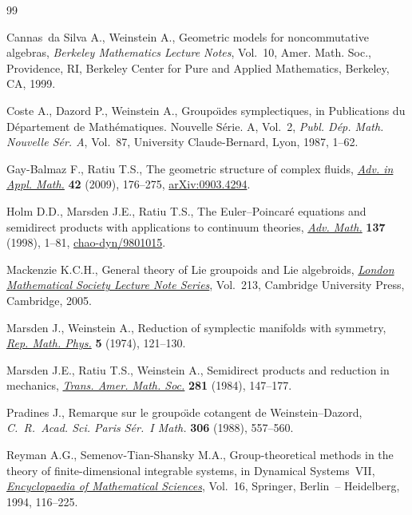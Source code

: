\documentclass[pdftex]{sigma}
\numberwithin{equation}{section}
\begin{document}
\begin{thebibliography}{99}
\footnotesize\itemsep=0pt

Cannas~da Silva A., Weinstein A., Geometric models for noncommutative algebras,
 \textit{Berkeley Mathematics Lecture Notes}, Vol.~10, Amer. Math. Soc.,
 Providence, RI, Berkeley Center for Pure and Applied Mathematics, Berkeley,
 CA, 1999.

Coste A., Dazord P., Weinstein A., Groupo\"\i des symplectiques, in
 Publications du {D}\'epartement de {M}ath\'ematiques. {N}ouvelle {S}\'erie.
 {A}, {V}ol.~2, \textit{Publ. D\'ep. Math. Nouvelle S\'er. A}, Vol.~87,
 University Claude-Bernard, Lyon, 1987, 1--62.

Gay-Balmaz F., Ratiu T.S., The geometric structure of complex f\/luids,
 \href{https://doi.org/10.1016/j.aam.2008.06.002}{\textit{Adv. in Appl. Math.}} \textbf{42} (2009), 176--275,
 \href{https://arxiv.org/abs/0903.4294}{arXiv:0903.4294}.

Holm D.D., Marsden J.E., Ratiu T.S., The {E}uler--{P}oincar\'e equations and
 semidirect products with applications to continuum theories, \href{https://doi.org/10.1006/aima.1998.1721}{\textit{Adv.
 Math.}} \textbf{137} (1998), 1--81, \href{https://arxiv.org/abs/chao-dyn/9801015}{chao-dyn/9801015}.

Mackenzie K.C.H., General theory of {L}ie groupoids and {L}ie algebroids,
 \href{https://doi.org/10.1017/CBO9781107325883}{\textit{London Mathematical Society Lecture Note Series}}, Vol.~213, Cambridge
 University Press, Cambridge, 2005.

Marsden J., Weinstein A., Reduction of symplectic manifolds with symmetry,
 \href{https://doi.org/10.1016/0034-4877(74)90021-4}{\textit{Rep. Math. Phys.}} \textbf{5} (1974), 121--130.

Marsden J.E., Ratiu T.S., Weinstein A., Semidirect products and reduction in
 mechanics, \href{https://doi.org/10.2307/1999527}{\textit{Trans. Amer. Math. Soc.}} \textbf{281} (1984), 147--177.

Pradines J., Remarque sur le groupo\"{\i}de cotangent de {W}einstein--{D}azord,
 \textit{C.~R.~Acad. Sci. Paris S\'er.~I Math.} \textbf{306} (1988), 557--560.

Reyman A.G., Semenov-Tian-Shansky M.A., Group-theoretical methods in the theory
 of f\/inite-dimensional integrable systems, in Dynamical Systems~VII,
 \href{https://doi.org/10.1007/978-3-662-06796-3_7}{\textit{Encyclopaedia of Mathematical Sciences}}, Vol.~16, Springer, Berlin~--
 Heidelberg, 1994, 116--225.


\end{thebibliography}
\end{document}

